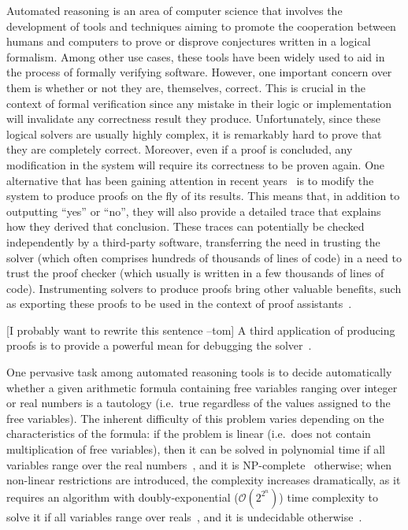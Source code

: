 \documentclass[a4paper, 12pt]{article}
\newcommand{\yell}[1]{{\color{blue} [#1]}}
\newcommand{\tom}[1]{\yell{#1 --tom}}
\begin{document}

Automated reasoning is an area of computer science that involves the development of tools and techniques aiming
to promote the cooperation between humans and computers to prove or disprove conjectures written in a logical
formalism. Among other use cases, these tools have been widely used to aid in the process of formally verifying software.
%
However, one important concern over them is whether or not they are, themselves, correct. This is crucial
in the context of formal verification since any mistake in their logic or implementation will invalidate any
correctness result they produce. Unfortunately, since these logical solvers are usually highly complex,
it is remarkably hard to prove that they are completely correct. Moreover, even if a proof is concluded,
any modification in the system will require its correctness to be proven again. One alternative that has been
gaining attention in recent years~\cite{generatingProofs, proofsInSmt} is to modify the system to produce
proofs on the fly of its results. This means that, in addition to outputting ``yes'' or ``no'', they will
also provide a detailed trace that explains how they derived that conclusion. These traces can potentially be
checked independently by a third-party software, transferring the need in trusting the solver (which often
comprises hundreds of thousands of lines of code) in a need to trust the proof checker (which usually is
written in a few thousands of lines of code).
%
Instrumenting solvers to produce proofs bring other valuable benefits, such as exporting these proofs
to be used in the context of proof assistants~\cite{coq2, reconstruct}.


\tom{I probably want to rewrite this sentence} A third application of producing proofs is to provide a
powerful mean for debugging the solver~\cite{generatingProofs}.
%


One pervasive task among automated reasoning tools is to decide
automatically whether a given arithmetic formula containing free variables ranging over integer or
real numbers is a tautology (i.e.\ true regardless of the values assigned to the free variables).
The inherent difficulty of this problem varies depending on the characteristics of the formula:
if the problem is linear (i.e.\ does not contain multiplication of free variables), then
it can be solved in polynomial time if all variables range over the real numbers~\cite{Kha79}, and it
is NP-complete~\cite{Kar72} otherwise; when non-linear restrictions are introduced, the complexity increases
dramatically, as it requires an algorithm with doubly-exponential ($\mathcal{O}(2^{2^{n}})$) time complexity
to solve it if all variables range over reals~\cite{computerAlgebraBook},
and it is undecidable otherwise~\cite{integerUndec}.
\end{document}
